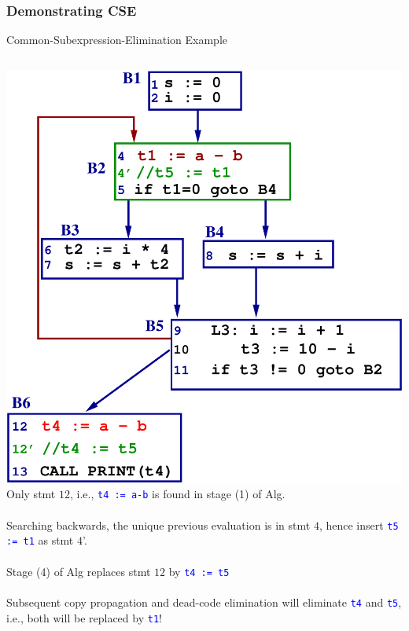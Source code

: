 \documentclass{beamer}
\newcommand{\blue}[1]{\textcolor{Blue}{{#1}}}
\renewcommand{\emph}[1]{\textcolor{structure}{#1}}
\begin{document}
\begin{frame}[fragile,t]
    \frametitle{Demonstrating CSE}


\begin{block}{Common-Subexpression-Elimination Example}
\begin{columns}
\includegraphics[width=37ex]{Figures/LoopCSE1}
Only stmt $12$, i.e., \blue{\tt t4 := a-b} is
found in stage \emph{(1)} of Alg.\\
$\mbox{~}$\\
Searching backwards, the
unique previous evaluation is
in stmt $4$, hence insert 
\blue{\tt t5 := t1} as stmt $4$'.\\
$\mbox{~}$\\
Stage \emph{(4)} of Alg replaces 
stmt $12$ by \blue{\tt t4 := t5}\\
$\mbox{~}$\\
Subsequent copy propagation
and dead-code elimination will
eliminate \blue{\tt t4} and \blue{\tt t5}, 
i.e., both will be replaced by \blue{\tt t1}!
\end{columns}
\end{block}

\end{frame}


\end{document}
